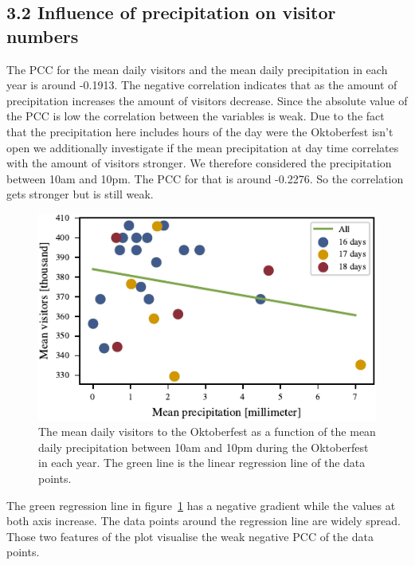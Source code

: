\documentclass{article}
\theoremstyle{plain}
\theoremstyle{definition}
\theoremstyle{remark}
\begin{document}
\subsection*{3.2 Influence of precipitation on visitor numbers}
The PCC for the mean daily visitors and the mean daily precipitation in each year is around -0.1913. The negative correlation indicates that as the amount of precipitation increases the amount of visitors decrease. Since the absolute value of the PCC is low the correlation between the variables is weak. Due to the fact that the precipitation here includes hours of the day were the Oktoberfest isn't open we additionally investigate if the mean precipitation at day time correlates with the amount of visitors stronger. We therefore considered the precipitation between 10am and 10pm. The PCC for that is around -0.2276. So the correlation gets stronger but is still weak.
\begin{figure}[ht]%
  \includegraphics{fig/totalprecipitation.pdf}
  \caption{The mean daily visitors to the Oktoberfest as a function of the mean daily precipitation between 10am and 10pm during the Oktoberfest in each year. The green line is the linear regression line of the data points.}
  \label{figure_precipitation}
\end{figure}
The green regression line in figure~\ref{figure_precipitation} has a negative gradient while the values at both axis increase. The data points around the regression line are widely spread. Those two features of the plot visualise the weak negative PCC of the data points.
\end{document}
